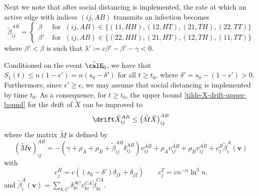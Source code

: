 \documentclass[11pt]{article}
\begin{document}
Next we note that after social distancing is implemented, 
the rate at which an active edge with indices $(ij,AB)$ transmits an infection becomes
\[
\tilde \beta_{ij}^{AB} = \begin{cases}
    \beta &\text{ for } \; (ij, AB) \in \{(11, HH), (12, HT), (21, TH), (22, TT)\} \\
    \beta'&\text{ for } \; (ij, AB) \in \{(22, HH), (21, HT), (12, TH), (11, TT)\}
\end{cases}
\]
where  $\beta'<\beta$ is such that $\lambda' := c\beta' - \beta' - \gamma < 0$. 

Conditioned on the event $\tilde\calE_0$, we have that
$S_1(t)\leq n(1-\epsilon')= n(s_0-\delta')$ for all  $t\geq t_0$, where $\delta'=s_0-(1-\epsilon')>0$.  Furthermore, since $\epsilon'\geq \epsilon$, we may assume that social distancing is implemented by time $t_0$.  As a consequence, for $t\geq t_0$, the upper bound 
\eqref{tilde-X-drift-upper-bound} for the drift of $\tilde X$ can be improved to
\begin{equation}\label{tilde-X-drift-upper-bound-sd}
     \drift \tilde X_{ij}^{AB}\leq
\left(\tilde M\tilde X\right)_{ij}^{AB}
\end{equation}
where the matrix $\tilde M$ is defined by 
\[
    (\tilde M\mathbf v)_{ij}^{AB}=
-\left(\gamma+\rho_{\bar A}+\rho_{\bar B}+\tilde\beta_{ij}^{AB} \delta_{ij}^{AB}\right) v_{ij}^{AB}
+\rho_{A}v_{ij}^{\bar A B}+\rho_{B}v_{ij}^{A\bar B}
+c_j^B\tilde\beta_i^A (\mathbf v)  
\]
with 
\[
    c_j^H = c((s_0 - \delta')\delta_{j1} + \delta_{j2}) \qquad c_j^T = cn^{-\alpha}\ln^3 n.
\]
and $\tilde \beta_i^A (\mathbf v) = \sum_{k, C} \delta_{ki}^{AC} v_{ki}^{CA} \tilde\beta_{ki}^{CA}$.
\end{document}
